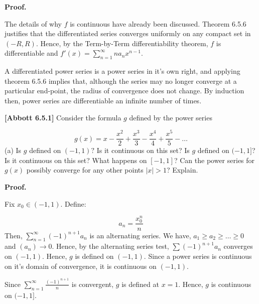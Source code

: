 \documentclass[10pt]{article}
\begin{document}
\textbf{Proof.}



The details of why $\displaystyle f$ is continuous have already been discussed. Theorem 6.5.6 justifies that the differentiated series converges uniformly on any compact set in $\displaystyle ( -R,R)$. Hence, by the Term-by-Term differentiability theorem, $\displaystyle f$ is differentiable and $\displaystyle f'( x) =\sum _{n=1}^{\infty } na_{n} x^{n-1}$.



A differentiated power series is a power series in it's own right, and applying theorem 6.5.6 implies that, although the series may no longer converge at a particular end-point, the radius of convergence does not change. By induction then, power series are differentiable an infinite number of times.



\textbf{[Abbott 6.5.1]} Consider the formula $\displaystyle g$ defined by the power series 


\begin{equation*}
g( x) =x-\frac{x^{2}}{2} +\frac{x^{3}}{3} -\frac{x^{4}}{4} +\frac{x^{5}}{5} -\dotsc 
\end{equation*}
(a) Is $\displaystyle g$ defined on $\displaystyle ( -1,1) ?$ Is it continuous on this set? Is $\displaystyle g$ defined on $\displaystyle ( -1,1]$? Is it continuous on this set? What happens on $\displaystyle [ -1,1]$? Can the power series for $\displaystyle g( x)$ possibly converge for any other points $\displaystyle |x| >1$? Explain.



\textbf{Proof.}



Fix $\displaystyle x_{0} \in ( -1,1)$. Define:


\begin{equation*}
a_{n} =\frac{x_{0}^{n}}{n}
\end{equation*}
Then, $\displaystyle \sum _{n=1}^{\infty }( -1)^{n+1} a_{n}$ is an alternating series. We have, $\displaystyle a_{1} \geq a_{2} \geq \dotsc \geq 0$ and $\displaystyle ( a_{n})\rightarrow 0$. Hence, by the alternating series test, $\displaystyle \sum ( -1)^{n+1} a_{n}$ converges on $\displaystyle ( -1,1)$. Hence, $\displaystyle g$ is defined on $\displaystyle ( -1,1)$. Since a power series is continuous on it's domain of convergence, it is continuous on $\displaystyle ( -1,1)$. 



Since $\displaystyle \sum _{n=1}^{\infty }\frac{( -1)^{n+1}}{n}$ is convergent, $\displaystyle g$ is defined at $\displaystyle x=1$. Hence, $\displaystyle g$ is continuous on $\displaystyle ( -1,1]$. 
\end{document}
